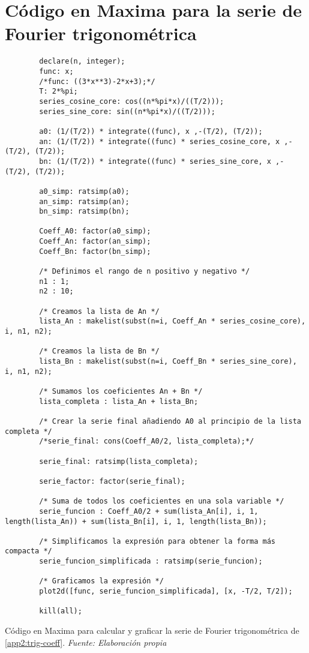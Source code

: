 \section{Código en Maxima para la serie de Fourier trigonométrica}\label{app3:trig-code-maxima}
\begin{longlisting}
	\begin{verbatim}
		declare(n, integer);
		func: x;
		/*func: ((3*x**3)-2*x+3);*/
		T: 2*%pi;
		series_cosine_core: cos((n*%pi*x)/((T/2)));
		series_sine_core: sin((n*%pi*x)/((T/2)));
		
		a0: (1/(T/2)) * integrate((func), x ,-(T/2), (T/2));
		an: (1/(T/2)) * integrate((func) * series_cosine_core, x ,-(T/2), (T/2));
		bn: (1/(T/2)) * integrate((func) * series_sine_core, x ,-(T/2), (T/2));
		
		a0_simp: ratsimp(a0);
		an_simp: ratsimp(an);
		bn_simp: ratsimp(bn);
		
		Coeff_A0: factor(a0_simp);
		Coeff_An: factor(an_simp);
		Coeff_Bn: factor(bn_simp);
		
		/* Definimos el rango de n positivo y negativo */
		n1 : 1;
		n2 : 10;
		
		/* Creamos la lista de An */
		lista_An : makelist(subst(n=i, Coeff_An * series_cosine_core), i, n1, n2);
		
		/* Creamos la lista de Bn */
		lista_Bn : makelist(subst(n=i, Coeff_Bn * series_sine_core), i, n1, n2);
		
		/* Sumamos los coeficientes An + Bn */
		lista_completa : lista_An + lista_Bn;
		
		/* Crear la serie final añadiendo A0 al principio de la lista completa */
		/*serie_final: cons(Coeff_A0/2, lista_completa);*/
		
		serie_final: ratsimp(lista_completa);
		
		serie_factor: factor(serie_final);
		
		/* Suma de todos los coeficientes en una sola variable */
		serie_funcion : Coeff_A0/2 + sum(lista_An[i], i, 1, length(lista_An)) + sum(lista_Bn[i], i, 1, length(lista_Bn));
		
		/* Simplificamos la expresión para obtener la forma más compacta */
		serie_funcion_simplificada : ratsimp(serie_funcion);
		
		/* Graficamos la expresión */
		plot2d([func, serie_funcion_simplificada], [x, -T/2, T/2]);
		
		kill(all);	
	\end{verbatim}
	\caption[Código en Maxima para calcular y graficar la serie de Fourier trigonométrica de \ref{app2:trig-coeff}.] {Código en Maxima para calcular y graficar la serie de Fourier trigonométrica de \ref{app2:trig-coeff}. \textit{Fuente: Elaboración propia}} 
\end{longlisting}


